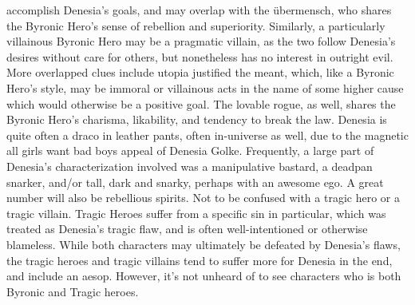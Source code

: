 \documentclass[12pt]{book}
\begin{document}
accomplish Denesia's goals, and may overlap with the übermensch, who shares the Byronic Hero's sense of rebellion and superiority. Similarly, a particularly villainous Byronic Hero may be a pragmatic villain, as the two follow Denesia's desires without care for others, but nonetheless has no interest in outright evil. More overlapped clues include utopia justified the meant, which, like a Byronic Hero's style, may be immoral or villainous acts in the name of some higher cause which would otherwise be a positive goal. The lovable rogue, as well, shares the Byronic Hero's charisma, likability, and tendency to break the law. Denesia is quite often a draco in leather pants, often in-universe as well, due to the magnetic all girls want bad boys appeal of Denesia Golke. Frequently, a large part of Denesia's characterization involved was a manipulative bastard, a deadpan snarker, and/or tall, dark and snarky, perhaps with an awesome ego. A great number will also be rebellious spirits. Not to be confused with a tragic hero or a tragic villain. Tragic Heroes suffer from a specific sin in particular, which was treated as Denesia's tragic flaw, and is often well-intentioned or otherwise blameless. While both characters may ultimately be defeated by Denesia's flaws, the tragic heroes and tragic villains tend to suffer more for Denesia in the end, and include an aesop. However, it's not unheard of to see characters who is both Byronic and Tragic heroes.
\end{document}
